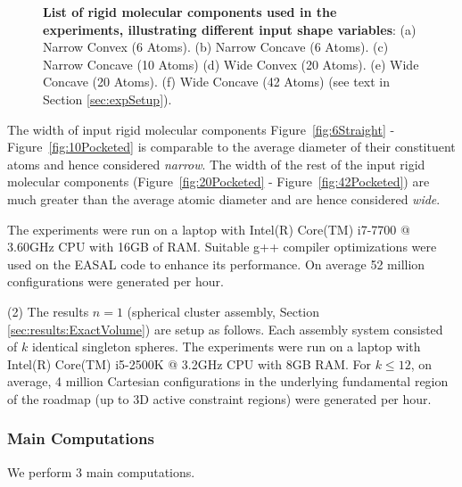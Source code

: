\documentclass[]{article}
\newcommand{\figref}[1]{Figure~\ref{#1}}
\newcommand{\rmc}{rigid molecular component}
\newcommand{\rahul}[1]{\color{black}{#1}\color{black}}
\begin{document}
\begin{figure}[htpb] \centering
{}
\caption{\scriptsize \textbf{List of \rmc s used in the experiments, illustrating different input 
shape variables}: (a) Narrow Convex (6 Atoms). (b) Narrow Concave (6
Atoms). (c) Narrow Concave (10 Atoms) (d) Wide Convex (20 Atoms). (e) Wide
		Concave (20 Atoms). (f) Wide Concave (42 Atoms) (see text in Section \ref{sec:expSetup}).}
\label{fig:inputMolecules}
\end{figure}

The width of input \rmc s \figref{fig:6Straight} - \figref{fig:10Pocketed} is
comparable to the average diameter of their constituent atoms and hence
considered \emph{narrow}. The width of the rest of the input \rmc s
(\figref{fig:20Pocketed} - \figref{fig:42Pocketed}) are much greater than the
average atomic diameter and are hence considered \emph{wide}. 

The experiments were run on a laptop with Intel(R) Core(TM) i7-7700 @ 3.60GHz
CPU with 16GB of RAM. Suitable g++ compiler optimizations were used on the
EASAL code \rahul{(open source software available on Bitbucket at
https://bitbucket.org/geoplexity/easal) } to enhance its performance.  On average
52 million configurations were generated per hour.


(2) The results $n=1$ (spherical cluster assembly, Section
\ref{sec:results:ExactVolume}) are setup as follows. Each assembly system
consisted of $k$ identical singleton spheres. The experiments were run on a
laptop with Intel(R) Core(TM) i5-2500K @ 3.2GHz CPU with 8GB RAM. For $k\le12$,
on average, 4 million Cartesian configurations in the underlying fundamental
region of the roadmap (up to 3D active constraint regions) were generated per
hour.


\subsubsection{Main Computations}
\label{sec:keyComputations}
We perform 3 main computations. 
\end{document}
